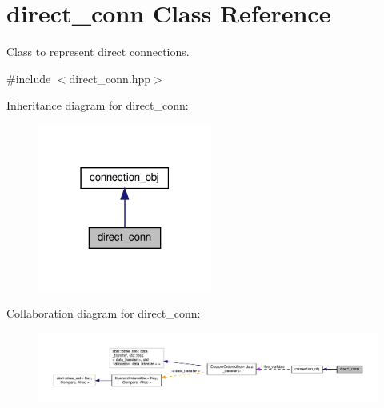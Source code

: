 \hypertarget{classdirect__conn}{}\section{direct\+\_\+conn Class Reference}
\label{classdirect__conn}


Class to represent direct connections.  




{\ttfamily \#include $<$direct\+\_\+conn.\+hpp$>$}



Inheritance diagram for direct\+\_\+conn\+:
\nopagebreak
\begin{figure}[H]
\begin{center}
\leavevmode
\includegraphics[width=162pt]{d2/da0/classdirect__conn__inherit__graph}
\end{center}
\end{figure}


Collaboration diagram for direct\+\_\+conn\+:
\nopagebreak
\begin{figure}[H]
\begin{center}
\leavevmode
\includegraphics[width=350pt]{d9/d7f/classdirect__conn__coll__graph}
\end{center}
\end{figure}
